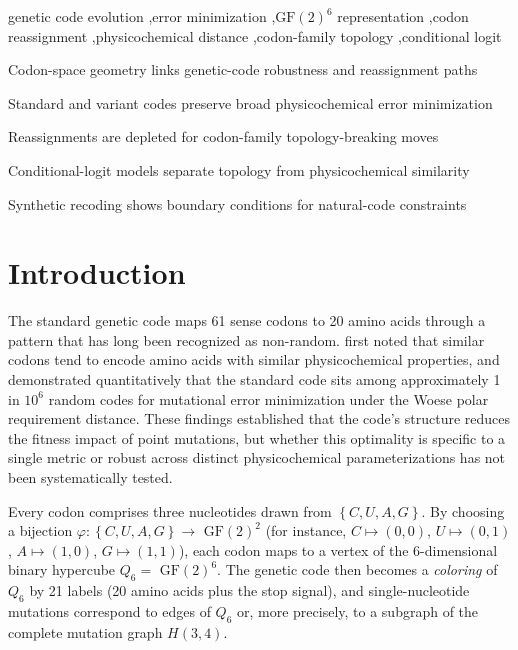 \documentclass[preprint,11pt,authoryear,a4paper]{elsarticle}
\begin{document}
\begin{frontmatter}
\begin{keyword}
genetic code evolution \sep error minimization \sep $\mathrm{GF}(2)^6$ representation \sep codon reassignment \sep physicochemical distance \sep codon-family topology \sep conditional logit
\end{keyword}

\begin{highlights}
\item Codon-space geometry links genetic-code robustness and reassignment paths
\item Standard and variant codes preserve broad physicochemical error minimization
\item Reassignments are depleted for codon-family topology-breaking moves
\item Conditional-logit models separate topology from physicochemical similarity
\item Synthetic recoding shows boundary conditions for natural-code constraints
\end{highlights}

\end{frontmatter}

\section{Introduction}\label{sec:intro}

The standard genetic code maps 61 sense codons to 20 amino acids through
a pattern that has long been recognized as non-random. \citep{woese1965}
first noted that similar codons tend to encode amino acids with similar
physicochemical properties, and \citep{freeland1998} demonstrated
quantitatively that the standard code sits among approximately 1 in
\(10^{6}\) random codes for mutational error minimization under the
Woese polar requirement distance. These findings established that the
code's structure reduces the fitness impact of point mutations, but
whether this optimality is specific to a single metric or robust across
distinct physicochemical parameterizations has not been systematically
tested.

Every codon comprises three nucleotides drawn from
\(\left\{ C,U,A,G \right\}\). By choosing a bijection
\(\varphi:\left\{ C,U,A,G \right\} \rightarrow {\text{ GF}(2)}^{2}\)
(for instance, \(C \mapsto (0,0)\), \(U \mapsto (0,1)\),
\(A \mapsto (1,0)\), \(G \mapsto (1,1)\)), each codon maps to a vertex
of the 6-dimensional binary hypercube \(Q_{6} = {\text{ GF}(2)}^{6}\).
The genetic code then becomes a \emph{coloring} of \(Q_{6}\) by 21
labels (20 amino acids plus the stop signal), and single-nucleotide
mutations correspond to edges of \(Q_{6}\) or, more precisely, to a
subgraph of the complete mutation graph \(H(3,4)\).
\end{document}
